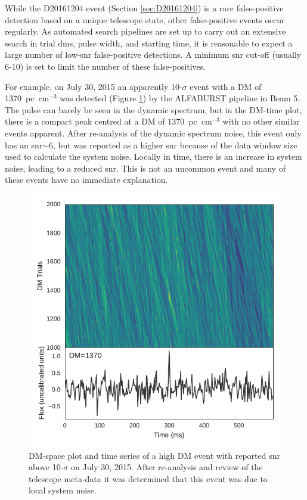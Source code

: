 \documentclass[a4paper,fleqn,usenatbib]{mnras}
\begin{document}
While the D20161204 event (Section \ref{sec:D20161204}) is a rare false-positive
detection based on a unique telescope state, other false-positive events occur
regularly.  As automated search pipelines are set up to carry out an extensive
search in trial \glspl{dm}, pulse width, and starting time, it is reasonable to
expect a large number of low-\gls{snr} false-positive detections. A minimum
\gls{snr} cut-off (usually 6-10) is set to limit the number of these
false-positives.

For example, on July 30, 2015 an apparently 10-$\sigma$ event with a DM of
1370~pc~cm$^{-3}$ was detected (Figure \ref{fig:D20150730}) by the ALFABURST
pipeline in Beam 5. The pulse can barely be seen in the dynamic spectrum, but in
the DM-time plot, there is a compact peak centred at a DM of 1370~pc~cm$^{-3}$
with no other similar events apparent.  After re-analysis of the dynamic
spectrum noise, this event only has an \gls{snr}$\sim$6, but was reported as a
higher \gls{snr} because of the data window size used to calculate the system
noise.  Locally in time, there is an increase in system noise, leading to a
reduced \gls{snr}.  This is not an uncommon event and many of these events have
no immediate explanation.

\begin{figure}
    \includegraphics[width=1.0\linewidth]{figures/D20150730_buf23_Beam6_dmtrial.pdf}
    \caption{DM-space plot and time series of a high DM event with reported
    \gls{snr} above 10-$\sigma$ on July 30, 2015. After re-analysis and review
    of the telescope meta-data it was determined that this event was due to
    local system noise.
    }
    \label{fig:D20150730}
\end{figure}
\end{document}
